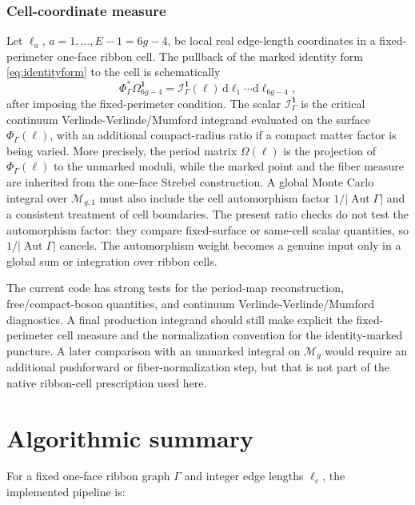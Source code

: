\documentclass[11pt]{article}
\numberwithin{equation}{section}
\newcommand{\cI}{\mathcal I}
\newcommand{\cM}{\mathcal M}
\newcommand{\dd}{\mathrm d}
\newcommand{\Aut}{\operatorname{Aut}}
\begin{document}
\subsubsection{Cell-coordinate measure}

Let \(\ell_a\), \(a=1,\ldots,E-1=6g-4\), be local real edge-length
coordinates in a fixed-perimeter one-face ribbon cell.  The pullback of the
marked identity form \eqref{eq:identityform} to the cell is schematically
\begin{equation}
        \Phi_{\Gamma}^{*}\Omega_{6g-4}^{\mathbf 1}
        =
        \cI_{\Gamma}^{\mathbf 1}(\ell)\,
        \dd\ell_1\cdots \dd\ell_{6g-4},
        \label{eq:cellmeasure}
\end{equation}
after imposing the fixed-perimeter condition.  The scalar
\(\cI_{\Gamma}^{\mathbf 1}\) is the critical continuum
Verlinde-Verlinde/Mumford integrand evaluated on the surface
\(\Phi_\Gamma(\ell)\), with an additional compact-radius ratio if a compact
matter factor is being varied.  More precisely, the period matrix
\(\Omega(\ell)\) is the projection of \(\Phi_\Gamma(\ell)\) to the unmarked
moduli, while the marked point and the fiber measure are inherited from the
one-face Strebel construction.  A global Monte Carlo integral over
\(\cM_{g,1}\) must also include the cell automorphism factor
\(1/|\Aut\Gamma|\) and a consistent treatment of cell boundaries.
The present ratio checks do not test the automorphism factor: they compare
fixed-surface or same-cell scalar quantities, so \(1/|\Aut\Gamma|\) cancels.
The automorphism weight becomes a genuine input only in a global sum or
integration over ribbon cells.

The current code has strong tests for the period-map reconstruction,
free/compact-boson quantities, and continuum Verlinde-Verlinde/Mumford
diagnostics.  A final production integrand should still make explicit the
fixed-perimeter cell measure and the normalization convention for the
identity-marked puncture.  A later comparison with an unmarked integral on
\(\cM_g\) would require an additional pushforward or fiber-normalization step,
but that is not part of the native ribbon-cell prescription used here.

\section{Algorithmic summary}

For a fixed one-face ribbon graph \(\Gamma\) and integer edge lengths
\(\ell_e\), the implemented pipeline is:
\end{document}
